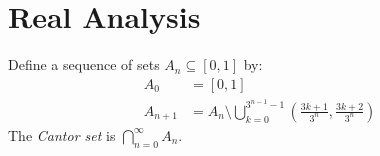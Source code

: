 \chapter{Real Analysis}

\begin{df}
  Define a sequence of sets $A_n \subseteq [0, 1]$ by:
  \begin{align*}
    A_0 & = [0,1] \\
    A_{n+1} & = A_n \setminus \bigcup_{k=0}^{3^{n-1} - 1}
    \left( \frac{3k+1}{3^n},     \frac{3k+2}{3^n} \right)
  \end{align*}
  The \emph{Cantor set} is $\bigcap_{n=0}^\infty A_n$.
\end{df}
